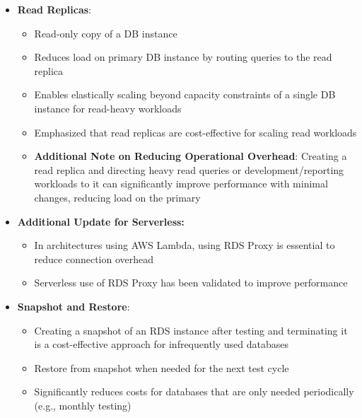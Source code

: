 \documentclass[11pt,a4paper]{report}
\begin{document}
\begin{itemize}
\begin{itemize}
  \item Particularly valuable for serverless applications with highly variable connection rates
  \item Pools and shares database connections efficiently between application instances
  \item Reduces connection overhead and minimizes connection timeouts during traffic spikes
  \item Requires minimal configuration - create a proxy and update application connection strings
  \item More effective solution than increasing database instance size or implementing Multi-AZ for handling connection issues
\end{itemize}
  \item \textbf{Read Replicas}:
\begin{itemize}
  \item Read-only copy of a DB instance
  \item Reduces load on primary DB instance by routing queries to the read replica
  \item Enables elastically scaling beyond capacity constraints of a single DB instance for read-heavy workloads
  \item Emphasized that read replicas are cost-effective for scaling read workloads
  \item \textbf{Additional Note on Reducing Operational Overhead}: Creating a read replica and directing heavy read queries or development/reporting workloads to it can significantly improve performance with minimal changes, reducing load on the primary
\end{itemize}
  \item \textbf{Additional Update for Serverless:}
\begin{itemize}
  \item In architectures using AWS Lambda, using RDS Proxy is essential to reduce connection overhead
  \item Serverless use of RDS Proxy has been validated to improve performance
\end{itemize}
  \item \textbf{Snapshot and Restore}:
\begin{itemize}
  \item Creating a snapshot of an RDS instance after testing and terminating it is a cost-effective approach for infrequently used databases
  \item Restore from snapshot when needed for the next test cycle
  \item Significantly reduces costs for databases that are only needed periodically (e.g., monthly testing)

\end{itemize}
\end{itemize}
\end{document}
